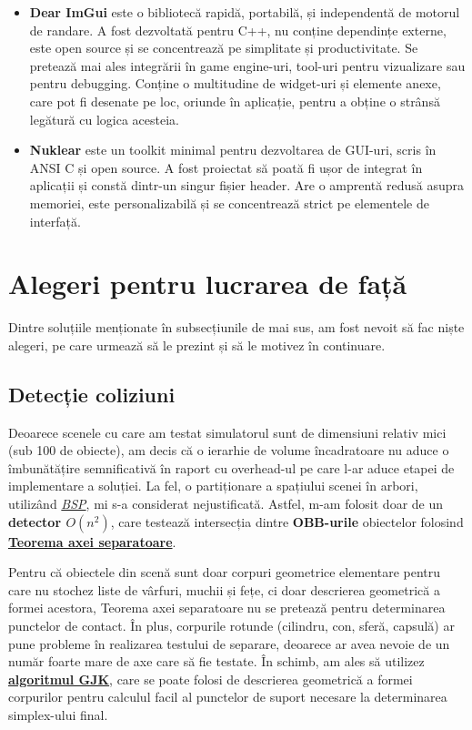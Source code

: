 \documentclass[12pt,a4paper]{report}
\begin{document}
\begin{enumerate}
	\begin{itemize}
		\item \textbf{Dear ImGui}\cite{imgui} este o bibliotecă rapidă, portabilă, și independentă de motorul de randare. A fost dezvoltată pentru C++, nu conține dependințe externe, este open source și se concentrează pe simplitate și productivitate. Se pretează mai ales integrării în game engine-uri, tool-uri pentru vizualizare sau pentru debugging. Conține o multitudine de widget-uri și elemente anexe, care pot fi desenate pe loc, oriunde în aplicație, pentru a obține o strânsă legătură cu logica acesteia.
		\item \textbf{Nuklear}\cite{nuklear} este un toolkit minimal pentru dezvoltarea de GUI-uri, scris în ANSI C și open source. A fost proiectat să poată fi ușor de integrat în aplicații și constă dintr-un singur fișier header. Are o amprentă redusă asupra memoriei, este personalizabilă și se concentrează strict pe elementele de interfață.
	\end{itemize}
\end{enumerate}

\section{Alegeri pentru lucrarea de față}

Dintre soluțiile menționate în subsecțiunile de mai sus, am fost nevoit să fac niște alegeri, pe care urmează să le prezint și să le motivez în continuare.

\subsection{Detecție coliziuni}

Deoarece scenele cu care am testat simulatorul sunt de dimensiuni relativ mici (sub 100 de obiecte), am decis că o ierarhie de volume încadratoare nu aduce o îmbunătățire semnificativă în raport cu overhead-ul pe care l-ar aduce etapei de implementare a soluției. La fel, o partiționare a spațiului scenei în arbori, utilizând \hyperref[bsp]{\textit{BSP}}, mi s-a considerat nejustificată. Astfel, m-am folosit doar de un \textbf{detector $O(n^2)$}, care testează intersecția dintre \textbf{OBB-urile} obiectelor folosind \hyperref[SAT]{\textbf{Teorema axei separatoare}}.

Pentru că obiectele din scenă sunt doar corpuri geometrice elementare pentru care nu stochez liste de vârfuri, muchii și fețe, ci doar descrierea geometrică a formei acestora, Teorema axei separatoare nu se pretează pentru determinarea punctelor de contact. În plus, corpurile rotunde (cilindru, con, sferă, capsulă) ar pune probleme în realizarea testului de separare, deoarece ar avea nevoie de un număr foarte mare de axe care să fie testate. În schimb, am ales să utilizez \hyperref[gjk_intersection_test]{\textbf{algoritmul GJK}}, care se poate folosi de descrierea geometrică a formei corpurilor pentru calculul facil al punctelor de suport necesare la determinarea simplex-ului final.
\end{document}
